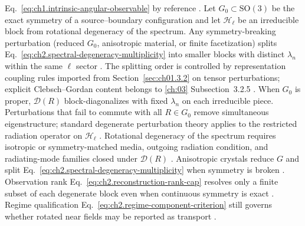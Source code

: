 Eq.~\eqref{eq:ch1.intrinsic-angular-observable} by reference \cite{stratton1941}.
\label{prop:ch2.degeneracy-splitting-broken-symmetry}
Let \(G_0\subset\mathrm{SO}(3)\) be the exact symmetry of a source--boundary configuration
and let \(\mathcal{H}_{\ell}\) be an irreducible block from rotational degeneracy of the
spectrum. Any symmetry-breaking perturbation
(reduced \(G_0\), anisotropic material, or finite facetization) splits
Eq.~\eqref{eq:ch2.spectral-degeneracy-multiplicity} into smaller blocks with distinct
\(\lambda_n\) within the same \(\ell\) sector \cite{stratton1941}. The
splitting order is controlled by representation coupling rules imported from
Section~\ref{sec:ch01.3.2} on tensor perturbations; explicit Clebsch--Gordan content belongs
to \ref{ch:03} Subsection~3.2.5 \cite{stratton1941}.
When \(G_0\) is proper, \(\mathcal{D}(R)\) block-diagonalizes with fixed \(\lambda_n\) on
each irreducible piece. Perturbations that fail to commute with all \(R\in G_0\) remove
simultaneous eigenstructure; standard degenerate perturbation theory applies to the
restricted radiation operator on \(\mathcal{H}_\ell\) \cite{stratton1941}. Rotational degeneracy of the spectrum requires isotropic or symmetry-matched
media, outgoing radiation condition, and radiating-mode families closed under \(\mathcal{D}(R)\)
\cite{stratton1941}. Anisotropic crystals reduce $G$ and split
Eq.~\eqref{eq:ch2.spectral-degeneracy-multiplicity} when symmetry is broken
\cite{stratton1941}. Observation rank Eq.~\eqref{eq:ch2.reconstruction-rank-cap}
resolves only a finite subset of each degenerate block even when continuous symmetry is exact
\cite{harrington2001}. Regime qualification
Eq.~\eqref{eq:ch2.regime-component-criterion} still governs whether rotated near fields may be
reported as transport \cite{stratton1941}.

